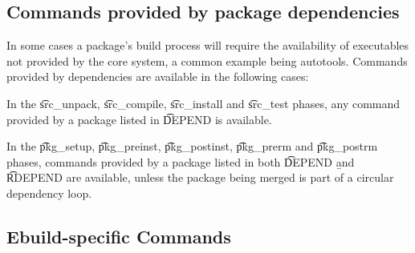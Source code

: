 \subsection{Commands provided by package dependencies}

In some cases a package's build process will require the availability of executables not provided by
the core system, a common example being autotools. Commands provided by dependencies are available
in the following cases:
\begin{bulletlist}
\item In the \t{src\_unpack}, \t{src\_compile}, \t{src\_install} and \t{src\_test} phases, any
    command provided by a package listed in \t{DEPEND} is available.
\item In the \t{pkg\_setup}, \t{pkg\_preinst}, \t{pkg\_postinst}, \t{pkg\_prerm} and \t{pkg\_postrm}
    phases, commands provided by a package listed in both \t{DEPEND} \b{and} \t{RDEPEND} are
    available, unless the package being merged is part of a circular dependency loop.
\end{bulletlist}

\subsection{Ebuild-specific Commands}


